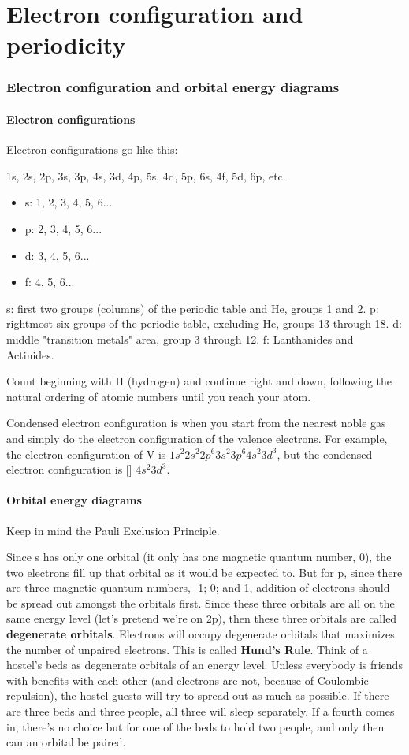\documentclass[letterpaper, 12pt]{article}
\begin{document}
\part{Electron configuration and periodicity}
\section{Electron configuration and orbital energy diagrams}
	\subsection{Electron configurations}
	Electron configurations go like this:
	
	1s, 2s, 2p, 3s, 3p, 4s, 3d, 4p, 5s, 4d, 5p, 6s, 4f, 5d, 6p, etc.
	
	\begin{itemize}
		\item s: 1, 2, 3, 4, 5, 6...
		\item p: 2, 3, 4, 5, 6...
		\item d: 3, 4, 5, 6...
		\item f: 4, 5, 6...
	\end{itemize}
	
	s: first two groups (columns) of the periodic table and He, groups 1 and 2.
	p: rightmost six groups of the periodic table, excluding He, groups 13 through 18.
	d: middle "transition metals" area, group 3 through 12.
	f: Lanthanides and Actinides.
	
	Count beginning with H (hydrogen) and continue right and down, following the natural ordering of atomic numbers until you reach your atom.
	
	Condensed electron configuration is when you start from the nearest noble gas and simply do the electron configuration of the valence electrons. For example, the electron configuration of V is $1s^2 2s^2 2p^6 3s^2 3p^6 4s^2 3d^3$, but the condensed electron configuration is [] $4s^2 3d^3$.
	
	\subsection{Orbital energy diagrams}
	Keep in mind the Pauli Exclusion Principle.
	
	Since s has only one orbital (it only has one magnetic quantum number, 0), the two electrons fill up that orbital as it would be expected to. But for p, since there are three magnetic quantum numbers, -1; 0; and 1, addition of electrons should be spread out amongst the orbitals first. Since these three orbitals are all on the same energy level (let's pretend we're on 2p), then these three orbitals are called \textbf{degenerate orbitals}. Electrons will occupy degenerate orbitals that maximizes the number of unpaired electrons. This is called \textbf{Hund's Rule}. Think of a hostel's beds as degenerate orbitals of an energy level. Unless everybody is friends with benefits with each other (and electrons are not, because of Coulombic repulsion), the hostel guests will try to spread out as much as possible. If there are three beds and three people, all three will sleep separately. If a fourth comes in, there's no choice but for one of the beds to hold two people, and only then can an orbital be paired.
	
\end{document}
